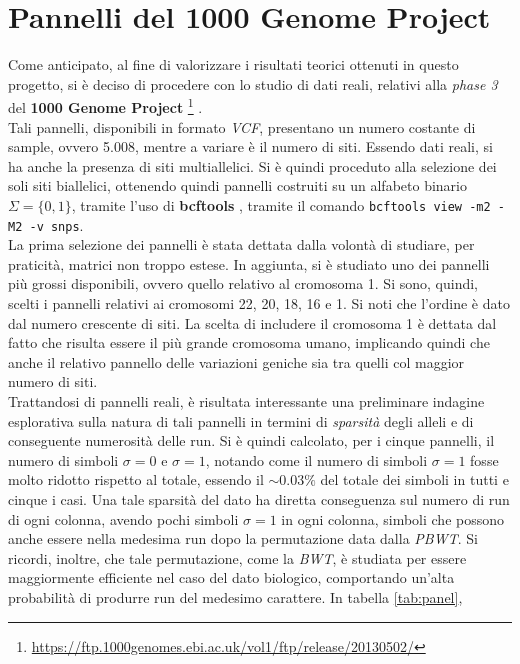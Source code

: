 \section{Pannelli del 1000 Genome Project}
Come anticipato, al fine di valorizzare i risultati teorici ottenuti in
questo progetto, si 
è deciso di procedere con lo studio di dati reali, relativi alla \textit{phase
  3} del \textbf{1000 Genome Project}
\footnote{\url{https://ftp.1000genomes.ebi.ac.uk/vol1/ftp/release/20130502/}}
\cite{1kgp}.\\ 
Tali pannelli, disponibili in formato \textit{VCF}, presentano un numero
costante di sample, ovvero 5.008, mentre a variare è il numero di siti. Essendo
dati reali, si ha anche la presenza di siti multiallelici. Si è quindi proceduto
alla selezione dei soli siti biallelici, ottenendo quindi pannelli costruiti su
un alfabeto binario $\Sigma=\{0,1\}$, tramite l'uso di \textbf{bcftools}
\cite{bcftools}, tramite il comando \texttt{bcftools view -m2 -M2
  -v snps}.\\
La prima selezione dei pannelli è stata dettata dalla volontà di studiare, per
praticità, matrici non troppo estese. In aggiunta, si è studiato uno dei
pannelli più grossi disponibili, ovvero quello relativo al cromosoma 1. Si sono,
quindi, scelti i pannelli relativi ai cromosomi 22, 20, 18, 16 e 1. Si noti che
l'ordine è dato dal numero crescente di siti. La scelta di includere il
cromosoma 1 è dettata dal fatto che risulta essere il più grande cromosoma
umano, implicando quindi che anche il relativo pannello delle variazioni geniche
sia tra quelli col maggior numero di siti.\\
Trattandosi di pannelli reali, è risultata interessante una preliminare
indagine esplorativa sulla natura di tali pannelli in termini di
\textit{sparsità} degli alleli e di conseguente numerosità delle run. Si è
quindi calcolato, per i cinque pannelli, il numero di simboli $\sigma=0$ e
$\sigma=1$, notando come il numero di simboli $\sigma=1$ fosse molto ridotto
rispetto al totale, essendo il $\sim 0.03\%$ del totale dei simboli in tutti e
cinque i casi. Una tale
sparsità del dato ha diretta conseguenza sul numero di run di ogni colonna,
avendo 
pochi simboli $\sigma=1$ in ogni colonna, simboli che possono anche
essere nella medesima run dopo la permutazione data dalla
\textit{PBWT}. Si ricordi, inoltre, che tale permutazione, come la
\textit{BWT}, è studiata per essere 
maggiormente efficiente nel caso del dato biologico, comportando un'alta
probabilità di produrre run del medesimo carattere. In tabella \ref{tab:panel},
